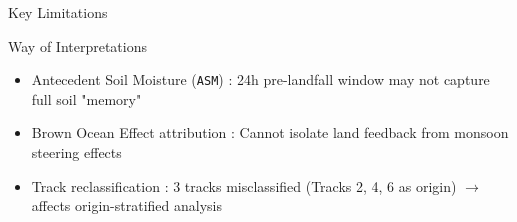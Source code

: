 \begin{frame}{Key Limitations}
	\vspace{-0.2cm}
	\begin{block}{\small Way of Interpretations}
		\footnotesize
		\begin{itemize}
			\item Antecedent Soil Moisture (\texttt{ASM}) : 24h pre-landfall window may not capture full soil "memory"
			\item Brown Ocean Effect attribution : Cannot isolate land feedback from monsoon steering effects
			\item Track reclassification : 3 tracks misclassified (Tracks 2, 4, 6 as origin) $\rightarrow$ affects origin-stratified analysis
		\end{itemize}
	\end{block}
\end{frame}

